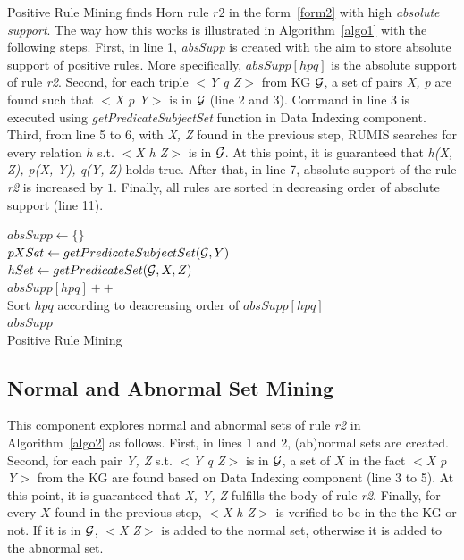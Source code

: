 Positive Rule Mining finds Horn rule $r2$ in the form~\ref{form2} with high \textit{absolute support}. The way how this works is illustrated in Algorithm~\ref{algo1} with the following steps. First, in line 1, \textit{absSupp} is created with the aim to store absolute support of positive rules. More specifically, $absSupp[hpq]$ is the absolute support of rule \textit{r2}. Second, for each triple \textit{$<$Y q Z$>$} from KG $\mathcal{G}$, a set of pairs \textit{X, p} are found such that \textit{$<$X p Y$>$} is in $\mathcal{G}$ (line 2 and 3). Command in line 3 is executed using \textit{getPredicateSubjectSet} function in Data Indexing component. Third, from line 5 to 6, with \textit{X, Z} found in the previous step, RUMIS searches for every relation $h$ s.t. \textit{$<$X h Z$>$} is in $\mathcal{G}$. At this point, it is guaranteed that \textit{h(X, Z), p(X, Y), q(Y, Z)} holds true. After that, in line 7, absolute support of the rule \textit{r2} is increased by $1$. Finally, all rules are sorted in decreasing order of absolute support (line 11).

\IncMargin{1.5em}
\begin{algorithm}[H]
\DontPrintSemicolon
\SetAlgoLined
{}
\BlankLine
$absSupp \leftarrow \{\}$\\
\BlankLine
{} {
    \BlankLine
	$pXSet \leftarrow getPredicateSubjectSet(\mathcal{G}, Y)$\\
	 {
		$hSet \leftarrow getPredicateSet(\mathcal{G}, X, Z)$\\
		 {
			$absSupp[hpq]++$\\
		}
	}
}
\BlankLine
Sort $hpq$ according to deacreasing order of $absSupp[hpq]$\\
\Return $absSupp$\\
\caption{Positive Rule Mining}
\label{algo1}
\end{algorithm}
\DecMargin{1.5em}

\subsection{Normal and Abnormal Set Mining}

This component explores normal and abnormal sets of rule \textit{r2} in Algorithm~\ref{algo2} as follows. First, in lines 1 and 2, (ab)normal sets are created. Second, for each pair \textit{Y, Z} s.t. \textit{$<$Y q Z$>$} is in $\mathcal{G}$, a set of $X$ in the fact \textit{$<$X p Y$>$} from the KG are found based on Data Indexing component (line 3 to 5). At this point, it is guaranteed that \textit{X, Y, Z}  fulfills the body of rule \textit{r2}. Finally, for every $X$ found in the previous step, \textit{$<$X h Z$>$} is verified to be in the the KG or not. If it is in $\mathcal{G}$, \textit{$<$X Z$>$} is added to the normal set, otherwise it is added to the abnormal set.


